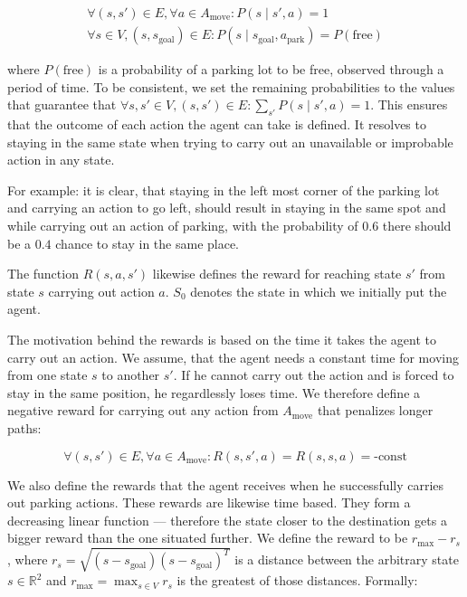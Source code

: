 \begin{eqnarray}
\forall (s, s') \in E, \forall a \in A_{\mbox{move}} : P(s \mid s', a) = 1 \\
\forall s \in V, (s,s_{\mbox{goal}}) \in E : P(s \mid s_{\mbox{goal}}, a_{\mbox{park}}) = P(\mbox{free})
\end{eqnarray}

where $P(\mbox{free})$ is a probability of a parking lot to be free, observed
through a period of time. To be consistent, we set the remaining probabilities
to the values that guarantee that $\forall s, s' \in V, (s, s') \in E :
\sum_{s'}P(s \mid s', a) = 1$. This ensures that the outcome of each action
the agent can take is defined. It resolves to staying in the same state when
trying to carry out an unavailable or improbable action in any state.

For example: it is clear, that staying in the left most corner of the parking
lot and carrying an action to go left, should result in staying in the same
spot and while carrying out an action of parking, with the probability of
$0.6$ there should be a $0.4$ chance to stay in the same place.

The function $R(s, a, s')$ likewise defines the reward for reaching state $s'$
from state $s$ carrying out action $a$. $S_0$ denotes the state in which we
initially put the agent.

The motivation behind the rewards is based on the time it takes the agent to
carry out an action. We assume, that the agent needs a constant time for
moving from one state $s$ to another $s'$. If he cannot carry out the action
and is forced to stay in the same position, he regardlessly loses time. We
therefore define a negative reward for carrying out any action from
$A_{\mbox{move}}$ that penalizes longer paths:

\begin{equation}
\forall (s, s') \in E, \forall a \in A_{\mbox{move}}: R(s, s', a) = R(s, s, a) = \mbox{-const}
\end{equation}

We also define the rewards that the agent receives when he successfully
carries out parking actions. These rewards are likewise time based. They form
a decreasing linear function --- therefore the state closer to the destination
gets a bigger reward than the one situated further. We define the reward to be
$r_{\max} - r_s$, where $r_s = \sqrt{(s - s_{\mbox{goal}}) {(s -
s_{\mbox{goal}})}^T}$ is a distance between the arbitrary state $s \in
\mathbb{R}^2$ and $r_{\max} = \max_{s \in V}r_s$ is the greatest of those
distances. Formally:

